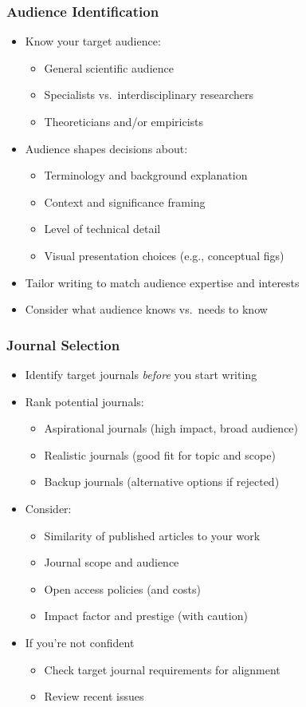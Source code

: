 \documentclass{beamer}
\begin{document}
\begin{frame}
  \frametitle{Audience Identification}
  \begin{itemize}
    \item Know your target audience:
    \begin{itemize}
      \item General scientific audience
      \item Specialists vs.\ interdisciplinary researchers
      \item Theoreticians and/or empiricists
    \end{itemize}
    \item Audience shapes decisions about:
    \begin{itemize}
      \item Terminology and background explanation
      \item Context and significance framing
      \item Level of technical detail
      \item Visual presentation choices (e.g., conceptual figs)
    \end{itemize}
    \item Tailor writing to match audience expertise and interests
    \item Consider what audience knows vs.\ needs to know
  \end{itemize}
\end{frame}

\begin{frame}
  \frametitle{Journal Selection}
  \begin{itemize}
    \item Identify target journals \emph{before} you start writing
    \item Rank potential journals:
    \begin{itemize}
      \item Aspirational journals (high impact, broad audience)
      \item Realistic journals (good fit for topic and scope)
      \item Backup journals (alternative options if rejected)
    \end{itemize}
    \item Consider:
    \begin{itemize}
      \item Similarity of published articles to your work
      \item Journal scope and audience
      \item {\tiny Open access policies (and costs)}
      \item {\tiny Impact factor and prestige (with caution)}
    \end{itemize}
    \item If you're not confident
    \begin{itemize}
      \item Check target journal requirements for alignment
      \item Review recent issues
    \end{itemize}
    \end{itemize}
\end{frame}
\end{document}
